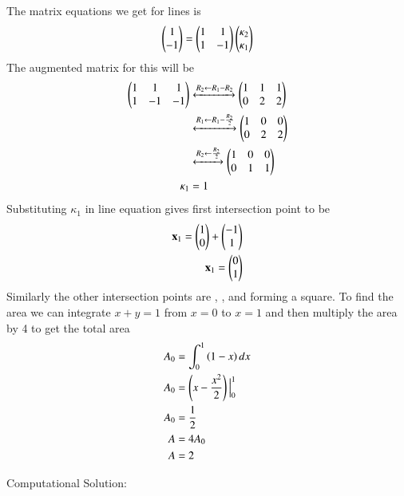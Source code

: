 \documentclass[journal]{IEEEtran}
\begin{document}
The matrix equations we get for lines  is
\begin{align}
	\begin{pmatrix}1\\-1\end{pmatrix} = \begin{pmatrix}1 & 1\\1 & -1\end{pmatrix}\begin{pmatrix}\kappa_2\\\kappa_1\end{pmatrix}
\end{align}
The augmented matrix for this will be
\begin{align}
  \begin{pmatrix}1 & 1 & 1\\1 & -1 & -1\end{pmatrix}  &\xleftrightarrow[]{R_2 \leftarrow {R_1-R_2}}\begin{pmatrix}1 & 1 & 1 \\0 & 2 & 2\end{pmatrix}\\
  &\xleftrightarrow[]{R_1 \leftarrow {R_1-\frac{R_2}{2}}}\begin{pmatrix}1 & 0 & 0 \\0 & 2 & 2\end{pmatrix}\\
  &\xleftrightarrow[]{R_2 \leftarrow {\frac{R_2}{2}}}\begin{pmatrix}1 & 0 & 0 \\0 & 1 & 1\end{pmatrix}\\
  \kappa_1 &= 1
\end{align}
Substituting $\kappa_1$ in line equation gives first intersection point to be
\begin{align}
	\mathbf{x}_1 = \begin{pmatrix}1\\0\end{pmatrix} + \begin{pmatrix}-1\\1\end{pmatrix}\\
	\mathbf{x}_1 = \begin{pmatrix}0\\1\end{pmatrix}
\end{align}
Similarly the other intersection points are , , and  forming a square. To find the area we can integrate $x+y=1$ from $x=0$ to $x=1$ and then multiply the area by 4 to get the total area   
\begin{align}
	A_0 &= \int_{0}^{1}\left(1-x\right)dx\\
	A_0 &= \left(x-\frac{x^2}{2}\right)\Big|_0^1\\
	A_0 &= \frac{1}{2}\\
	A &= 4A_0\\
	A &= 2
\end{align}

Computational Solution:\newline
\end{document}
